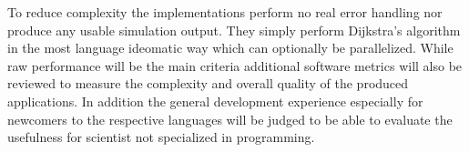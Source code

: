 To reduce complexity the implementations perform no real error handling nor produce any usable simulation output. They simply perform Dijkstra's algorithm in the most language ideomatic way which can optionally be parallelized. While raw performance will be the main criteria additional software metrics will also be reviewed to measure the complexity and overall quality of the produced applications. In addition the general development experience especially for newcomers to the respective languages will be judged to be able to evaluate the usefulness for scientist not specialized in programming.

